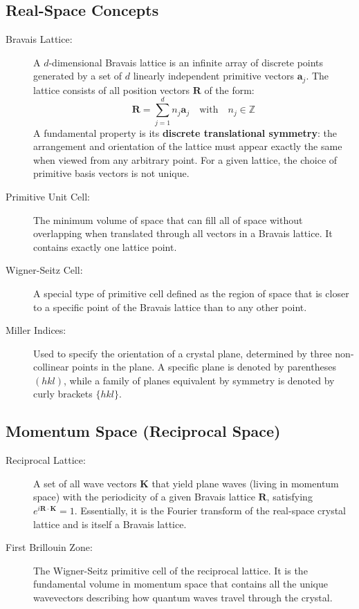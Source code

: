 \documentclass[10pt, a4paper]{article}
\begin{document}
\subsection*{Real-Space Concepts}
\begin{description}
    \item[Bravais Lattice:] A $d$-dimensional Bravais lattice is an infinite array of discrete points generated by a set of $d$ linearly independent primitive vectors $\mathbf{a}_j$. The lattice consists of all position vectors $\mathbf{R}$ of the form:
    \begin{equation}
        \mathbf{R} = \sum^d_{j=1} n_j \mathbf{a}_j \quad \text{with}\quad n_j\in\mathbb{Z}
    \end{equation}
    A fundamental property is its \textbf{discrete translational symmetry}: the arrangement and orientation of the lattice must appear exactly the same when viewed from any arbitrary point. For a given lattice, the choice of primitive basis vectors is not unique.
    
    \item[Primitive Unit Cell:] The minimum volume of space that can fill all of space without overlapping when translated through all vectors in a Bravais lattice. It contains exactly one lattice point.
    
    \item[Wigner-Seitz Cell:] A special type of primitive cell defined as the region of space that is closer to a specific point of the Bravais lattice than to any other point.
    
    \item[Miller Indices:] Used to specify the orientation of a crystal plane, determined by three non-collinear points in the plane. A specific plane is denoted by parentheses $(hkl)$, while a family of planes equivalent by symmetry is denoted by curly brackets $\{hkl\}$.
\end{description}

\subsection*{Momentum Space (Reciprocal Space)}
\begin{description}
    \item[Reciprocal Lattice:] A set of all wave vectors $\mathbf{K}$ that yield plane waves (living in momentum space) with the periodicity of a given Bravais lattice $\mathbf{R}$, satisfying $e^{i\mathbf{R}\cdot\mathbf{K}}=1$. Essentially, it is the Fourier transform of the real-space crystal lattice and is itself a Bravais lattice.
    
    \item[First Brillouin Zone:] The Wigner-Seitz primitive cell of the reciprocal lattice. It is the fundamental volume in momentum space that contains all the unique wavevectors describing how quantum waves travel through the crystal.
\end{description}
\end{document}
